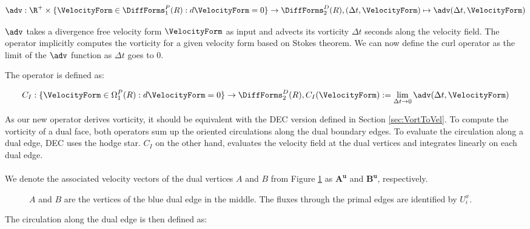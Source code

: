 \begin{equation}
\adv : \R^+ \times \{ \VelocityForm \in \DiffForms^P_1(R) : d \VelocityForm = 0 \} \rightarrow \DiffForms^D_2(R), 
(\Delta t,\VelocityForm) \mapsto \adv(\Delta t,\VelocityForm)
\end{equation}

$\adv$ takes a divergence free velocity form $\VelocityForm$ as input and advects its vorticity $\Delta t$ seconds along the velocity field.
The operator implicitly computes the vorticity for a given velocity form based on Stokes theorem.
We can now define the curl operator as the limit of the $\adv$ function as $\Delta t$ goes to $0$.

\begin{definition}
The  operator is defined as:

\begin{equation}
C_I :  \{ \VelocityForm \in \Omega^P_1(R) : d \VelocityForm = 0 \} \rightarrow \DiffForms^D_2(R) , C_I(\VelocityForm) := \lim_{\Delta t \rightarrow 0} \adv(\Delta t,\VelocityForm)
\end{equation}

\end{definition}

As our new operator derives vorticity, it should be equivalent with the DEC version defined in Section \ref{sec:VortToVel}.
To compute the vorticity of a dual face, both operators sum up the oriented circulations along the dual boundary edges.
To evaluate the circulation along a dual edge, DEC uses the hodge star. 
$C_I$ on the other hand, evaluates the velocity field at the dual vertices and integrates linearly on each dual edge.

\paragraph*{}
We denote the associated velocity vectors of the dual vertices $A$ and $B$ from Figure \ref{fig:IntCirculation} as $\mathbf{A^u}$ and $\mathbf{B^u}$, respectively.

\begin{figure}[h!]
	\centering
 	
	\caption[Circulation along a dual edge]{$A$ and $B$ are the vertices of the blue dual edge in the middle. The fluxes through the primal edges are identified by $U^x_i$.}
	\label{fig:IntCirculation}
\end{figure}

The circulation along the dual edge is then defined as:

